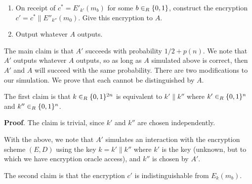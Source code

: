 \documentclass{article}
\begin{document}
\begin{enumerate}[,label=\alph*.]
\begin{enumerate}[noitemsep,topsep=\mdcompacttopsep]
\item{}On receipt of $c^* = E'_{k'}(m_b)$ for some $b \in_R \{0,1\}$, construct the encryption 
$c' = c^* \| E''_{k''}(m_0)$. Give this encryption to $A$.%

\item{}Output whatever $A$ outputs.%
\end{enumerate}%

The main claim is that $A'$ succeeds with probability $1/2 + p(n)$. We note that $A'$ outputs whatever
$A$ outputs, so as long as $A$ simulated above is correct, then $A'$ and $A$ will succeed with the 
same probability. There are two modifications to our simulation. We prove that each cannot be 
distinguished by $A$.%

The first claim is that $k \in_R \{0,1\}^{2n}$ is equivalent to $k' \| k''$ where $k' \in_R \{0,1\}^n$ and $k'' \in_R \{0,1\}^n$.%

\begin{mdbmarginx}{1ex}{0pt}{1ex}{0pt}%
\noindent{}\textbf{Proof}.   The claim is trivial, since $k'$ and $k''$ are chosen independently. 
 \mdfloatright{\ensuremath{\Box}}%
\end{mdbmarginx}%

With the above, we note that $A'$ simulates an interaction with the encryption scheme $(E,D)$ using 
the key $k = k' \| k''$ where $k'$ is the key (unknown, but to which we have encryption oracle access),
and $k''$ is chosen by $A'$.%

The second claim is that the encryption $c'$ is indistinguishable from $E_k(m_b)$.%


\end{enumerate}
\end{document}
